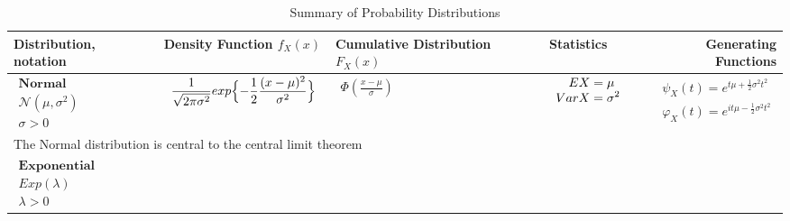 \documentclass{article}
\begin{document}
\begin{landscape}
\begin{table}[ht]
\begin{tabular}{@{}l p{6.5cm} p{4.5cm} p{3.0cm} r@{}}
        \bottomrule
        \end{tabular}
        \end{table}


\begin{table}[ht]
\centering
\caption{Summary of Probability Distributions}
\label{tab:probability_distributions}

\begin{tabular}{@{}l p{6.0cm} p{5cm} p{3.0cm} r@{}}
\toprule
Distribution, notation & Density Function $f_X(x)$ & Cumulative Distribution $F_X(x)$ & Statistics & Generating Functions \\ 
\midrule
$\begin{array}{l}
        \textbf{Normal} \\
        \mathcal{N}(\mu, \sigma^2) \\
        \sigma > 0
\end{array}$ & 
$\begin{array}{l}
\displaystyle  \frac{1}{\sqrt{2\pi \sigma^2}} exp \Bigl\{  -\frac{1}{2} \frac{(x-\mu)^2}{\sigma^2}\Bigr\}\\
\end{array}$ & 
$\begin{array}{l}
    \displaystyle  \Phi \left(\frac{x-\mu}{\sigma}\right)
\end{array}$ & 
$\begin{array}{l}
\displaystyle \hspace{0.36cm}  EX = \mu \\
\displaystyle VarX = \sigma^2
\end{array}$ & 
$\begin{array}{r}
\displaystyle \psi_X(t) = e^{t\mu + \frac{1}{2} \sigma^2 t^2} \\
\displaystyle \varphi_X(t) = e^{it\mu - \frac{1}{2} \sigma^2 t^2}
\end{array}$ \\
\multicolumn{4}{p{19cm}}{The Normal distribution is central to the central limit theorem} \\


$\begin{array}{l}
    \textbf{Exponential} \\
    Exp(\lambda) \\
    \lambda > 0
\end{array}$ & 


\end{tabular}
\end{table}
\end{landscape}
\end{document}
